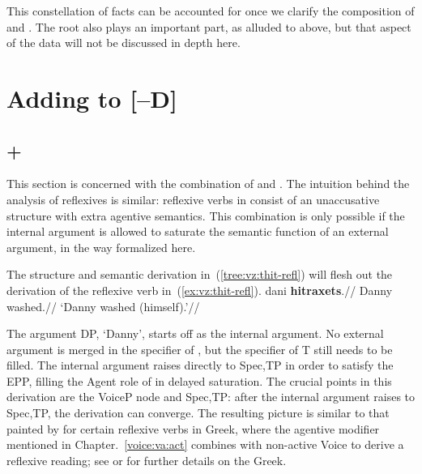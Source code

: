 {{This constellation of facts can be accounted for once we clarify the composition of {\va} and {\vz}. The root also plays an important part, as alluded to above, but that aspect of the data will not be discussed in depth here.



\section{Adding {\va} to [--D]} \label{vz:va}


	\subsection{{\vd} + {\va}} \label{vz:va:vzva}
This section is concerned with the combination of {\va} and {\vz}. The intuition behind the analysis of reflexives is similar: reflexive verbs in {\thit} consist of an unaccusative structure with extra agentive semantics. This combination is only possible if the internal argument is allowed to saturate the semantic function of an external argument, in the way formalized here.

The structure and semantic derivation in~(\ref{tree:vz:thit-refl}) will flesh out the derivation of the reflexive verb in~(\ref{ex:vz:thit-refl}).
\ex \label{ex:vz:thit-refl}
\begingl
\gla dani \textbf{hitraxets}.//
\glb Danny washed.//
\glft `Danny washed (himself).'//
\endgl
\xe

The argument DP, `Danny', starts off as the internal argument. No external argument is merged in the specifier of {\vz}, but the specifier of T still needs to be filled. The internal argument raises directly to Spec,TP in order to satisfy the EPP, filling the Agent role of {\vz} in delayed saturation. The crucial points in this derivation are the VoiceP node and Spec,TP: after the internal argument raises to Spec,TP, the derivation can converge. The resulting picture is similar to that painted by \cite{spathasetal15} for certain reflexive verbs in Greek, where the agentive modifier mentioned in Chapter.~\ref{voice:va:act} combines with non-active Voice to derive a reflexive reading; see \cite{spathasetal15} or \cite{kastner17gjgl} for further details on the Greek.

}}
